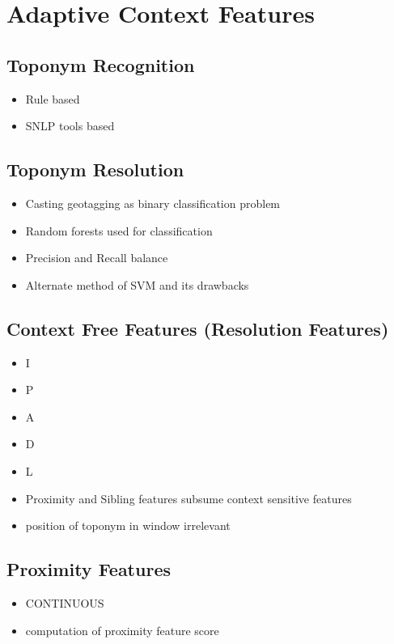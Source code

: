 \documentclass[
     11pt,         %
     a4paper,      %
     oneside,
     ]{article}
\begin{document}
\section{Adaptive Context Features}\label{sec:acf}


\subsection{Toponym Recognition}\label{subsec:titlepage}
\begin{itemize}
	\item Rule based
	\item SNLP tools based
\end{itemize}
\subsection{Toponym Resolution}
\begin{itemize}
	\item Casting geotagging as binary classification problem
	\item Random forests used for classification
	\item Precision and Recall balance
	\item Alternate method of SVM and its drawbacks
\end{itemize}
\subsection{Context Free Features (Resolution Features)}
\begin{itemize}
	\item I
	\item P
	\item A
	\item D
	\item L
\end{itemize}

\begin{itemize}
	\item Proximity and Sibling features subsume context sensitive features
	\item position of toponym in window irrelevant
\end{itemize}
\subsection{Proximity Features}
\begin{itemize}
	\item CONTINUOUS
	\item computation of proximity feature score
\end{itemize}
\end{document}
